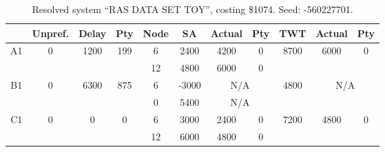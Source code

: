 \begin{sidewaystable}
\footnotesize
\caption{Resolved system ``RAS DATA SET TOY'', costing \$1074. Seed: -560227701.}
\centering
\begin{tabular}{c||c|c|c||c|c|c|c||c|c|c}
  \hline \hline
  &
  Unpref. & 
  Delay &
  Pty &
  Node &
  SA &
  Actual &
  Pty &
  TWT &
  Actual &
  Pty \\
      \hline
      \multirow{2}{*}{A1} &
      \multirow{2}{*}{0} &
      \multirow{2}{*}{1200} &
      \multirow{2}{*}{199} &
      6 &
      2400 &
        4200 &
        0 &
      \multirow{2}{*}{8700} &
        \multirow{2}{*}{6000} &
        \multirow{2}{*}{0}
      \\
      \cline{5-8}
       &
       &
       &
       &
      12 &
      4800 &
        6000 &
        0 &
      
         &
        
      \\
      \hline
      \multirow{2}{*}{B1} &
      \multirow{2}{*}{0} &
      \multirow{2}{*}{6300} &
      \multirow{2}{*}{875} &
      6 &
      -3000 &
        \multicolumn{2}{|c||}{N/A} &
      \multirow{2}{*}{4800} &
        \multicolumn{2}{c}{\multirow{2}{*}{N/A}}
      \\
      \cline{5-8}
       &
       &
       &
       &
      0 &
      5400 &
        \multicolumn{2}{|c||}{N/A} &
      
        
      \\
      \hline
      \multirow{2}{*}{C1} &
      \multirow{2}{*}{0} &
      \multirow{2}{*}{0} &
      \multirow{2}{*}{0} &
      6 &
      3000 &
        2400 &
        0 &
      \multirow{2}{*}{7200} &
        \multirow{2}{*}{4800} &
        \multirow{2}{*}{0}
      \\
      \cline{5-8}
       &
       &
       &
       &
      12 &
      6000 &
        4800 &
        0 &
      
         &
        
      \\
\end{tabular}
\label{table:RASDATASETTOY} 
\end{sidewaystable}